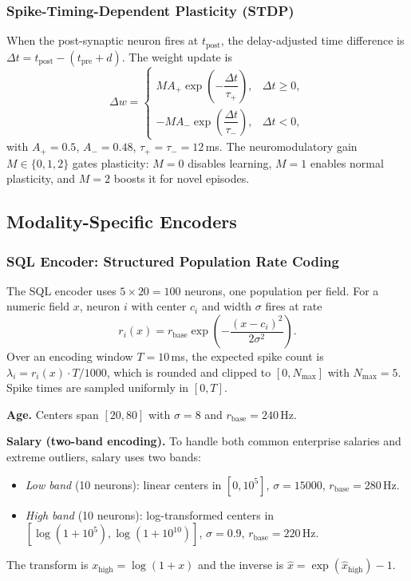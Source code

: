 \subsubsection{Spike-Timing-Dependent Plasticity (STDP)}

When the post-synaptic neuron fires at $t_{\mathrm{post}}$, the delay-adjusted time difference is $\Delta t = t_{\mathrm{post}} - (t_{\mathrm{pre}} + d)$. The weight update is
\begin{equation}
\Delta w =
\begin{cases}
M A_+ \exp\!\left(-\dfrac{\Delta t}{\tau_+}\right), & \Delta t \geq 0, \\[8pt]
-M A_- \exp\!\left(\dfrac{\Delta t}{\tau_-}\right), & \Delta t < 0,
\end{cases}
\label{eq:stdp}
\end{equation}
with $A_+ = 0.5$, $A_- = 0.48$, $\tau_+ = \tau_- = 12$\,ms. The neuromodulatory gain $M \in \{0,1,2\}$ gates plasticity: $M=0$ disables learning, $M=1$ enables normal plasticity, and $M=2$ boosts it for novel episodes.


\subsection{Modality-Specific Encoders}
\label{sec:encoders}

\subsubsection{SQL Encoder: Structured Population Rate Coding}

The SQL encoder uses $5 \times 20 = 100$ neurons, one population per field. For a numeric field $x$, neuron $i$ with center $c_i$ and width $\sigma$ fires at rate
\begin{equation}
r_i(x) = r_{\mathrm{base}} \exp\!\left(-\frac{(x - c_i)^2}{2\sigma^2}\right).
\end{equation}
Over an encoding window $T = 10$\,ms, the expected spike count is $\lambda_i = r_i(x) \cdot T/1000$, which is rounded and clipped to $[0, N_{\max}]$ with $N_{\max}=5$. Spike times are sampled uniformly in $[0, T]$.

\textbf{Age.} Centers span $[20, 80]$ with $\sigma=8$ and $r_{\mathrm{base}}=240$\,Hz.

\textbf{Salary (two-band encoding).} To handle both common enterprise salaries and extreme outliers, salary uses two bands:
\begin{itemize}
    \item \textit{Low band} (10 neurons): linear centers in $[0, 10^5]$, $\sigma=15000$, $r_{\mathrm{base}}=280$\,Hz.
    \item \textit{High band} (10 neurons): log-transformed centers in $[\log(1+10^5), \log(1+10^{10})]$, $\sigma=0.9$, $r_{\mathrm{base}}=220$\,Hz.
\end{itemize}
The transform is $x_{\mathrm{high}} = \log(1+x)$ and the inverse is $\hat{x} = \exp(\hat{x}_{\mathrm{high}}) - 1$.

